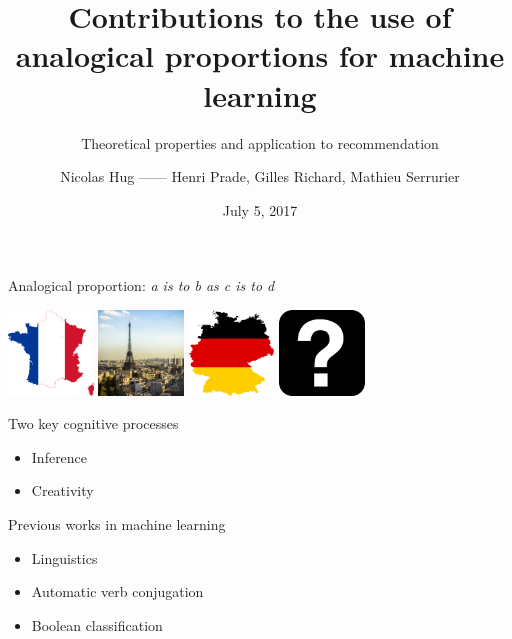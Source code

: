 \documentclass{beamer}
\title{Contributions to the use of analogical proportions for machine learning}
\subtitle{Theoretical properties and application to recommendation}
\date{July 5, 2017}
\author{Nicolas Hug  ------ Henri Prade, Gilles Richard, Mathieu Serrurier}
\institute{Université Toulouse III Paul Sabatier - IRIT}
\begin{document}
\maketitle

\begin{frame}{Analogical proportion: \textit{a is to b as c is to d}}
  \begin{center}
  \includegraphics[width=0.17\textwidth]{figures/france.png}
  \includegraphics[width=0.17\textwidth]{figures/paris.jpg}
  \includegraphics[width=0.17\textwidth]{figures/germany.png}
  \includegraphics[width=0.17\textwidth]{figures/question-mark.jpg}
  \end{center}
  \begin{block}{Two key cognitive processes}
    \begin{itemize}
    \item Inference
    \item Creativity
    \end{itemize}
  \end{block}
  \begin{block}{Previous works in machine learning}
    \begin{itemize}
      \item Linguistics \cite{Lep03}
      \item Automatic verb conjugation \cite{StrYvoREPORT05}
      \item Boolean classification \cite{BayMicDelIJCAI07}
    \end{itemize}
  \end{block}
\end{frame}
\end{document}

